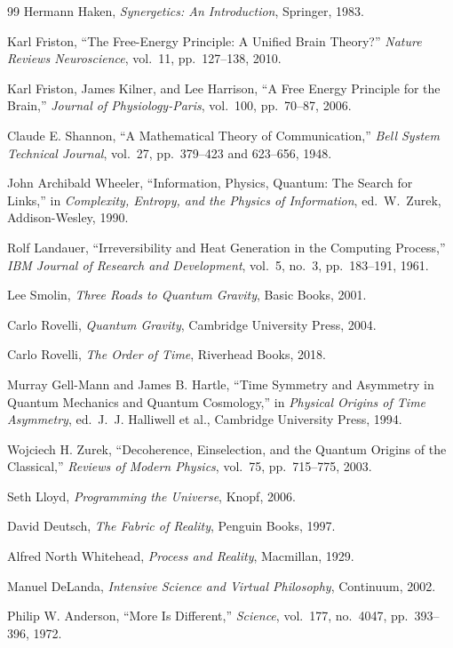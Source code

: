\documentclass[12pt, a4paper]{article}
\begin{document}
\begin{thebibliography}{99}
Hermann Haken,
\textit{Synergetics: An Introduction},
Springer, 1983.

Karl Friston,
``The Free-Energy Principle: A Unified Brain Theory?''
\textit{Nature Reviews Neuroscience},
vol.~11, pp.~127--138, 2010.

Karl Friston, James Kilner, and Lee Harrison,
``A Free Energy Principle for the Brain,''
\textit{Journal of Physiology-Paris},
vol.~100, pp.~70--87, 2006.

Claude E. Shannon,
``A Mathematical Theory of Communication,''
\textit{Bell System Technical Journal},
vol.~27, pp.~379--423 and 623--656, 1948.

John Archibald Wheeler,
``Information, Physics, Quantum: The Search for Links,''
in \textit{Complexity, Entropy, and the Physics of Information},
ed.\ W.~Zurek, Addison-Wesley, 1990.

Rolf Landauer,
``Irreversibility and Heat Generation in the Computing Process,''
\textit{IBM Journal of Research and Development},
vol.~5, no.~3, pp.~183--191, 1961.

Lee Smolin,
\textit{Three Roads to Quantum Gravity},
Basic Books, 2001.

Carlo Rovelli,
\textit{Quantum Gravity},
Cambridge University Press, 2004.

Carlo Rovelli,
\textit{The Order of Time},
Riverhead Books, 2018.

Murray Gell-Mann and James B. Hartle,
``Time Symmetry and Asymmetry in Quantum Mechanics and Quantum Cosmology,''
in \textit{Physical Origins of Time Asymmetry},
ed.\ J.~J. Halliwell et al.,
Cambridge University Press, 1994.

Wojciech H. Zurek,
``Decoherence, Einselection, and the Quantum Origins of the Classical,''
\textit{Reviews of Modern Physics},
vol.~75, pp.~715--775, 2003.

Seth Lloyd,
\textit{Programming the Universe},
Knopf, 2006.

David Deutsch,
\textit{The Fabric of Reality},
Penguin Books, 1997.

Alfred North Whitehead,
\textit{Process and Reality},
Macmillan, 1929.

Manuel DeLanda,
\textit{Intensive Science and Virtual Philosophy},
Continuum, 2002.

Philip W. Anderson,
``More Is Different,''
\textit{Science},
vol.~177, no.~4047, pp.~393--396, 1972.

\end{thebibliography}
\end{document}
